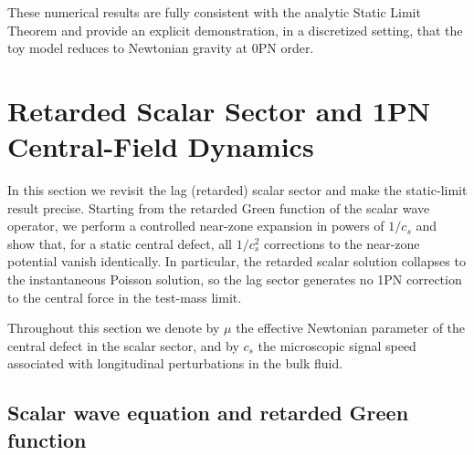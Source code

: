 \documentclass[11pt]{article}
\newcommand{\cS}{c_s}
\begin{document}
These numerical results are fully consistent with the analytic Static Limit Theorem and provide an explicit demonstration, in a discretized setting, that the toy model reduces to Newtonian gravity at 0PN order.

\section{Retarded Scalar Sector and 1PN Central-Field Dynamics}
\label{sec:retarded_scalar_1pn}

In this section we revisit the lag (retarded) scalar sector and make the static-limit result precise. Starting from the retarded Green function of the scalar wave operator, we perform a controlled near-zone expansion in powers of $1/\cS$ and show that, for a static central defect, all $1/\cS^2$ corrections to the near-zone potential vanish identically. In particular, the retarded scalar solution collapses to the instantaneous Poisson solution, so the lag sector generates no 1PN correction to the central force in the test-mass limit.

Throughout this section we denote by $\mu$ the effective Newtonian parameter
of the central defect in the scalar sector, and by $\cS$ the microscopic
signal speed associated with longitudinal perturbations in the bulk fluid.

\subsection{Scalar wave equation and retarded Green function}
\end{document}

